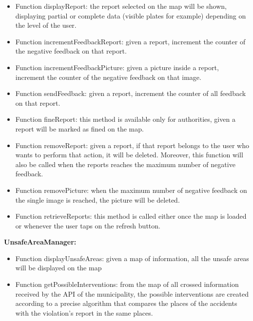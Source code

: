 \documentclass[../RASD.tex]{subfiles}
\begin{document}
    \begin{itemize}
        \item     Function displayReport: the report selected on the map will be shown, displaying partial or complete data (visible plates for example)
        depending on the level of the user.
        \item     Function incrementFeedbackReport: given a report, increment the counter of the negative feedback on that report.
        \item     Function incrementFeedbackPicture: given a picture inside a report, increment the counter of the negative feedback on that image.
        \item     Function sendFeedback: given a report, increment the counter of all feedback on that report.
        \item     Function fineReport: this method is available only for authorities, given a report will be marked as fined on the map.
        \item     Function removeReport: given a report, if that report belongs to the user who wants to perform that action, it will be deleted.
        Moreover, this function will also be called when the reports reaches the maximum number of negative feedback.
        \item     Function removePicture: when the maximum number of negative feedback on the single image is reached, the picture will be deleted.
        \item     Function retrieveReports: this method is called either once the map is loaded or whenever the user taps on the refresh button.
    \end{itemize}
    \textbf{UnsafeAreaManager:}
    \begin{itemize}
        \item     Function displayUnsafeAreas: given a map of information, all the unsafe areas will be displayed on the map
        \item     Function getPossibleInterventions: from the map of all crossed information received by the API of the municipality,
        the possible interventions are created according to a precise algorithm that compares the places of the accidents with the violation’s report
        in the same places.
    \end{itemize}
    \newpage
\end{document}
